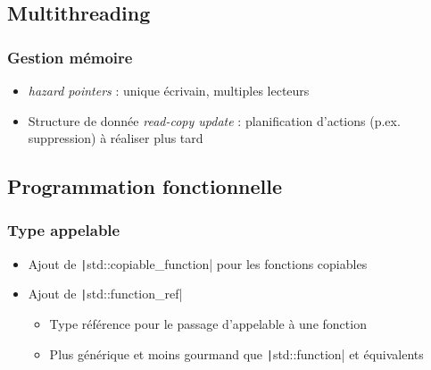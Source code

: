 \documentclass[C++.tex]{subfiles}
\begin{document}
\subsection*{Multithreading}
\begin{frame}[fragile]
	\frametitle{Gestion mémoire}
	\begin{itemize}
		\item \textit{hazard pointers} : unique écrivain, multiples lecteurs
		\item Structure de donnée \textit{read-copy update} : planification d'actions (p.ex. suppression) à réaliser plus tard
	\end{itemize}

\end{frame}

\subsection*{Programmation fonctionnelle}
\begin{frame}[fragile]
	\frametitle{Type appelable}
	\begin{itemize}
		\item Ajout de \texttt|std::copiable_function| pour les fonctions copiables
		\item Ajout de \texttt|std::function_ref|
		\begin{itemize}
			\item Type référence pour le passage d'appelable à une fonction
			\item Plus générique et moins gourmand que \texttt|std::function| et équivalents

		\end{itemize}
	\end{itemize}

\end{frame}
\end{document}
